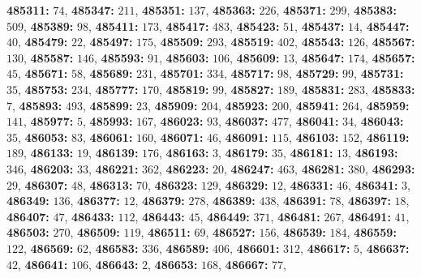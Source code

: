 \textsf{\bfseries 485311:} $74$, \textsf{\bfseries 485347:} $211$, \textsf{\bfseries 485351:} $137$, \textsf{\bfseries 485363:} $226$, \textsf{\bfseries 485371:} $299$, \textsf{\bfseries 485383:} $509$, \textsf{\bfseries 485389:} $98$, \textsf{\bfseries 485411:} $173$, \textsf{\bfseries 485417:} $483$, \textsf{\bfseries 485423:} $51$, \textsf{\bfseries 485437:} $14$, \textsf{\bfseries 485447:} $40$, \textsf{\bfseries 485479:} $22$, \textsf{\bfseries 485497:} $175$, \textsf{\bfseries 485509:} $293$, \textsf{\bfseries 485519:} $402$, \textsf{\bfseries 485543:} $126$, \textsf{\bfseries 485567:} $130$, \textsf{\bfseries 485587:} $146$, \textsf{\bfseries 485593:} $91$, \textsf{\bfseries 485603:} $106$, \textsf{\bfseries 485609:} $13$, \textsf{\bfseries 485647:} $174$, \textsf{\bfseries 485657:} $45$, \textsf{\bfseries 485671:} $58$, \textsf{\bfseries 485689:} $231$, \textsf{\bfseries 485701:} $334$, \textsf{\bfseries 485717:} $98$, \textsf{\bfseries 485729:} $99$, \textsf{\bfseries 485731:} $35$, \textsf{\bfseries 485753:} $234$, \textsf{\bfseries 485777:} $170$, \textsf{\bfseries 485819:} $99$, \textsf{\bfseries 485827:} $189$, \textsf{\bfseries 485831:} $283$, \textsf{\bfseries 485833:} $7$, \textsf{\bfseries 485893:} $493$, \textsf{\bfseries 485899:} $23$, \textsf{\bfseries 485909:} $204$, \textsf{\bfseries 485923:} $200$, \textsf{\bfseries 485941:} $264$, \textsf{\bfseries 485959:} $141$, \textsf{\bfseries 485977:} $5$, \textsf{\bfseries 485993:} $167$, \textsf{\bfseries 486023:} $93$, \textsf{\bfseries 486037:} $477$, \textsf{\bfseries 486041:} $34$, \textsf{\bfseries 486043:} $35$, \textsf{\bfseries 486053:} $83$, \textsf{\bfseries 486061:} $160$, \textsf{\bfseries 486071:} $46$, \textsf{\bfseries 486091:} $115$, \textsf{\bfseries 486103:} $152$, \textsf{\bfseries 486119:} $189$, \textsf{\bfseries 486133:} $19$, \textsf{\bfseries 486139:} $176$, \textsf{\bfseries 486163:} $3$, \textsf{\bfseries 486179:} $35$, \textsf{\bfseries 486181:} $13$, \textsf{\bfseries 486193:} $346$, \textsf{\bfseries 486203:} $33$, \textsf{\bfseries 486221:} $362$, \textsf{\bfseries 486223:} $20$, \textsf{\bfseries 486247:} $463$, \textsf{\bfseries 486281:} $380$, \textsf{\bfseries 486293:} $29$, \textsf{\bfseries 486307:} $48$, \textsf{\bfseries 486313:} $70$, \textsf{\bfseries 486323:} $129$, \textsf{\bfseries 486329:} $12$, \textsf{\bfseries 486331:} $46$, \textsf{\bfseries 486341:} $3$, \textsf{\bfseries 486349:} $136$, \textsf{\bfseries 486377:} $12$, \textsf{\bfseries 486379:} $278$, \textsf{\bfseries 486389:} $438$, \textsf{\bfseries 486391:} $78$, \textsf{\bfseries 486397:} $18$, \textsf{\bfseries 486407:} $47$, \textsf{\bfseries 486433:} $112$, \textsf{\bfseries 486443:} $45$, \textsf{\bfseries 486449:} $371$, \textsf{\bfseries 486481:} $267$, \textsf{\bfseries 486491:} $41$, \textsf{\bfseries 486503:} $270$, \textsf{\bfseries 486509:} $119$, \textsf{\bfseries 486511:} $69$, \textsf{\bfseries 486527:} $156$, \textsf{\bfseries 486539:} $184$, \textsf{\bfseries 486559:} $122$, \textsf{\bfseries 486569:} $62$, \textsf{\bfseries 486583:} $336$, \textsf{\bfseries 486589:} $406$, \textsf{\bfseries 486601:} $312$, \textsf{\bfseries 486617:} $5$, \textsf{\bfseries 486637:} $42$, \textsf{\bfseries 486641:} $106$, \textsf{\bfseries 486643:} $2$, \textsf{\bfseries 486653:} $168$, \textsf{\bfseries 486667:} $77$, 
